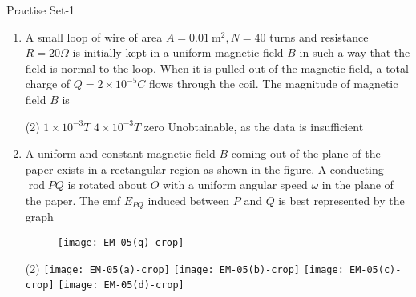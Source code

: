 \newpage
\begin{abox}
	Practise Set-1
\end{abox}
\begin{enumerate}[ label=\color{ocre}\textbf{\arabic*.}]
	\item A small loop of wire of area $A=0.01 \mathrm{~m}^{2}, N=40$ turns and resistance $R=20 \Omega$ is initially kept in a uniform magnetic field $B$ in such a way that the field is normal to the loop. When it is pulled out of the magnetic field, a total charge of $Q=2 \times 10^{-5} C$ flows through the coil. The magnitude of magnetic field $B$ is {}
	\begin{tasks}(2)
		\task[\textbf{a.}]$1 \times 10^{-3} T$
		\task[\textbf{b.}]$4 \times 10^{-3} T$
		\task[\textbf{c.}]zero
		\task[\textbf{d.}] Unobtainable, as the data is insufficient
	\end{tasks}
	\item A uniform and constant magnetic field $B$ coming out of the plane of the paper exists in a rectangular region as shown in the figure. A conducting $\operatorname{rod} P Q$ is rotated about $O$ with a uniform angular speed $\omega$ in the plane of the paper. The emf $E_{P Q}$ induced between $P$ and $Q$ is best represented by the graph{}
	\begin{figure}[H]
		\begin{center}
			\texttt{[image: EM-05(q)-crop]}
		\end{center}
	\end{figure}
	\begin{tasks}(2)
		\task[\textbf{a.}] \texttt{[image: EM-05(a)-crop]}
		\task[\textbf{b.}] \texttt{[image: EM-05(b)-crop]}
		\task[\textbf{c.}] \texttt{[image: EM-05(c)-crop]}
		\task[\textbf{d.}] \texttt{[image: EM-05(d)-crop]}
	\end{tasks}
	

\end{enumerate}
